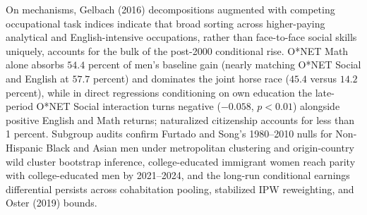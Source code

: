\documentclass[11pt]{article}
\begin{document}
On mechanisms, Gelbach (2016) decompositions augmented with competing occupational task indices indicate that broad sorting across higher-paying analytical and English-intensive occupations, rather than face-to-face social skills uniquely, accounts for the bulk of the post-2000 conditional rise. O*NET Math alone absorbs $54.4$ percent of men's baseline gain (nearly matching O*NET Social and English at $57.7$ percent) and dominates the joint horse race ($45.4$ versus $14.2$ percent), while in direct regressions conditioning on own education the late-period O*NET Social interaction turns negative ($-0.058$, $p < 0.01$) alongside positive English and Math returns; naturalized citizenship accounts for less than 1 percent. Subgroup audits confirm Furtado and Song's 1980--2010 nulls for Non-Hispanic Black and Asian men under metropolitan clustering and origin-country wild cluster bootstrap inference, college-educated immigrant women reach parity with college-educated men by 2021--2024, and the long-run conditional earnings differential persists across cohabitation pooling, stabilized IPW reweighting, and Oster (2019) bounds.
\end{document}
